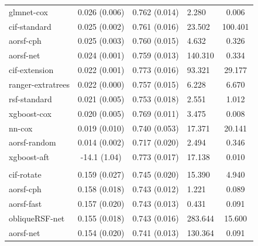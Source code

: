 \documentclass[twoside,11pt]{article}\usepackage[]{graphicx}\usepackage[]{xcolor}
\newenvironment{knitrout}{}{} %
\begin{document}
\begin{knitrout}
\begin{longtable}[t]{lcclc}
\hspace{1em}glmnet-cox & 0.026 (0.006) & 0.762 (0.014) & 2.280 & 0.006\\
\hspace{1em}cif-standard & 0.025 (0.002) & 0.761 (0.016) & 23.502 & 100.401\\
\hspace{1em}aorsf-cph & 0.025 (0.003) & 0.760 (0.015) & 4.632 & 0.326\\
\hspace{1em}aorsf-net & 0.024 (0.001) & 0.759 (0.013) & 140.310 & 0.334\\
\hspace{1em}cif-extension & 0.022 (0.001) & 0.773 (0.016) & 93.321 & 29.177\\
\hspace{1em}ranger-extratrees & 0.022 (0.000) & 0.757 (0.015) & 6.228 & 6.670\\
\hspace{1em}rsf-standard & 0.021 (0.005) & 0.753 (0.018) & 2.551 & 1.012\\
\hspace{1em}xgboost-cox & 0.020 (0.005) & 0.769 (0.011) & 3.475 & 0.008\\
\hspace{1em}nn-cox & 0.019 (0.010) & 0.740 (0.053) & 17.371 & 20.141\\
\hspace{1em}aorsf-random & 0.014 (0.002) & 0.717 (0.020) & 2.494 & 0.346\\
\hspace{1em}xgboost-aft & -14.1 (1.04) & 0.773 (0.017) & 17.138 & 0.010\\
\addlinespace[0.3em]
\hline
\multicolumn{5}{l}{\textit{\textbf{Monoclonal gammopathy; death, n = 1384, p = 8}}}\\
\hline
\hspace{1em}cif-rotate & 0.159 (0.027) & 0.745 (0.020) & 15.390 & 4.940\\
\hspace{1em}aorsf-cph & 0.158 (0.018) & 0.743 (0.012) & 1.221 & 0.089\\
\hspace{1em}aorsf-fast & 0.157 (0.020) & 0.743 (0.013) & 0.431 & 0.091\\
\hspace{1em}obliqueRSF-net & 0.155 (0.018) & 0.743 (0.016) & 283.644 & 15.600\\
\hspace{1em}aorsf-net & 0.154 (0.020) & 0.741 (0.013) & 130.364 & 0.091\\

\end{longtable}
\end{knitrout}
\end{document}
